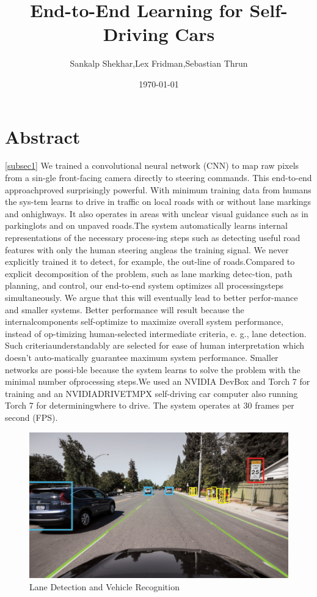 \documentclass[a4paper]{IEEEtran}
\begin{document}
		\title{End-to-End Learning for Self-Driving Cars}
		\author{Sankalp Shekhar,Lex Fridman,Sebastian Thrun}
		\date{\today}
		\maketitle
		\newpage
		\section{Abstract}
		 \ref{subsec1} We trained a convolutional neural network (CNN) to map raw pixels from a sin-gle front-facing camera directly to steering commands. This end-to-end approachproved surprisingly powerful. With minimum training data from humans the sys-tem learns to drive in traffic on local roads with or without lane markings and onhighways. It also operates in areas with unclear visual guidance such as in parkinglots and on unpaved roads.The system automatically learns internal representations of the necessary process-ing steps such as detecting useful road features with only the human steering angleas the training signal. We never explicitly trained it to detect, for example, the out-line of roads.Compared to explicit decomposition of the problem, such as lane marking detec-tion, path planning, and control, our end-to-end system optimizes all processingsteps  simultaneously.   We  argue  that  this  will  eventually  lead  to  better  perfor-mance and smaller systems.  Better performance will result because the internalcomponents self-optimize to maximize overall system performance, instead of op-timizing human-selected intermediate criteria, e. g., lane detection.  Such criteriaunderstandably are selected for ease of human interpretation which doesn’t auto-matically guarantee maximum system performance.  Smaller networks are possi-ble because the system learns to solve the problem with the minimal number ofprocessing steps.We  used  an  NVIDIA  DevBox  and  Torch  7  for  training  and  an  NVIDIADRIVETMPX  self-driving  car  computer  also  running  Torch  7  for  determiningwhere to drive. The system operates at 30 frames per second (FPS).
		 	\begin{figure}[h]
		 		\includegraphics[width=\linewidth]{latex1.jpg}
		 		\caption{Lane Detection and Vehicle Recognition}
		 		\label{figref1}
		 	\end{figure}
	
\end{document}

